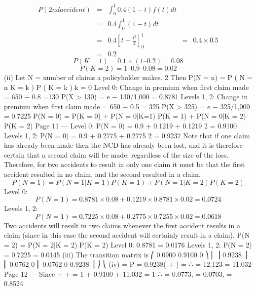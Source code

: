 \documentclass[a4paper,12pt]{article}
\begin{document}
\begin{eqnarray*}
P(2 nd accident) &=&
\int^{1}_{0}  0.4(1 − t ) f ( t ) dt \\

&=& 0.4 \int^{1}_{0} (1 − t ) dt\\
&=& 0.4 \left[ t − \frac{t^2}{2} \right]^{1}_{0}
&=& 0.4 \times 0.5\\ 
&=& 0.2
\end{eqnarray*}
\[ P(K = 1) = 0.1 \times (1 – 0.2) = 0.08\]
\[ P(K = 2) = 1 – 0.9 – 0.08 = 0.02\]
(ii)
Let N = number of claims a policyholder makes.
2
Then P(N = n) = \sum  P ( N = n K = k ) P ( K = k )
k = 0
Level 0:
Change in premium when first claim made = 650 − 0.8 =130
P(X > 130) = e − 130/1,000 = 0.8781
Levels 1, 2: Change in premium when first claim made = 650 − 0.5  =
325
P(X > 325) = e − 325/1,000 = 0.7225
P(N = 0) = P(K = 0) + P(N = 0|K=1) P(K = 1)
+ P(N = 0|K = 2) P(K = 2)
Page 11 — %
Level 0:
P(N = 0) = 0.9 + 0.1219  + 0.1219 2 
= 0.9100
Levels 1, 2: P(N = 0) = 0.9 + 0.2775  + 0.2775 2 
= 0.9237
Note that if one claim has already been made then the NCD has already been
lost, and it is therefore certain that a second claim will be made, regardless of
the size of the loss. Therefore, for two accidents to result in only one claim it
must be that the first accident resulted in no claim, and the second resulted in a
claim.
\[P(N = 1) = P(N = 1|K = 1) P(K = 1) + P(N = 1|K = 2) P(K = 2)\]
Level 0:
\[P(N = 1) = 0.8781 \times  0.08 + 0.1219\times  0.8781 \times  0.02
= 0.0724\]
Levels 1, 2: 
\[P(N = 1) = 0.7225 \times  0.08 + 0.2775 \times  0.7255 \times  0.02
= 0.0618\]
Two accidents will result in two claims whenever the first accident results in a
claim (since in this case the second accident will certainly result in a claim).
P(N = 2) = P(N = 2|K = 2) P(K = 2)
Level 0:
0.8781  = 0.0176
Levels 1, 2: P(N = 2) = 0.7225  = 0.0145
(iii)
The transition matrix is
⎛ 0.0900 0.9100 0
⎞
⎜
⎟
0.9238 ⎟
⎜ 0.0762 0
⎜ 0.0762 0
0.9238 ⎟ ⎠
⎝
(iv)
\pi  = P  = 
0.9238( +  ) = 
∴  = 12.123 = 11.032
Page 12 — %
Since  +  +  = 1
 + 0.9100 + 11.032 = 1
∴  = 0.0773,  = 0.0703,  = 0.8524
\end{document}
